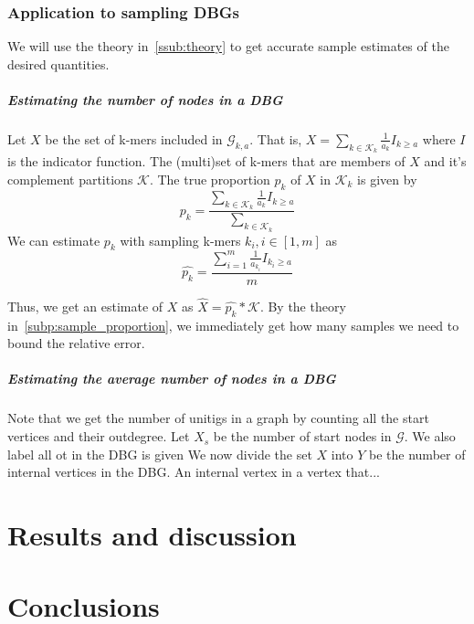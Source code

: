 \documentclass[a4paper,6pt]{article}
\begin{document}
\subsubsection{Application to sampling DBGs} %
\label{sub:application_to_sampling_db_graphs}
We will use the theory in~\ref{ssub:theory} to get accurate sample estimates of the desired quantities. 
\subparagraph{Estimating the number of nodes in a DBG} %
\label{subp:estimating_the_number_of_nodes_in_a_db_graph}
Let $X$ be the set of k-mers included in $\mathcal{G}_{k,a}$. That is, $X = \sum_{k\in \mathcal{K}_k} \frac{1}{a_k}I_{k\geq a}$ where $I$ is the indicator function. The (multi)set of k-mers that are members of $X$ and it's complement partitions $\mathcal{K}$. The true proportion $p_k$ of $X$ in $\mathcal{K}_k$ is given by
\begin{equation}
	p_k = \frac{\sum_{k\in \mathcal{K}_k} \frac{1}{a_k}I_{k\geq a} }{ \sum_{k\in \mathcal{K}_k} }
\end{equation}
 We can estimate $p_k$ with sampling k-mers $k_i, i\in[1,m]$ as
\begin{equation}
	\hat{p_k} = \frac{\sum_{i = 1}^m \frac{1}{a_{k_i}}I_{{k_i}\geq a} } { m}
\end{equation}

 Thus, we get an estimate of $X$ as $\hat{X} = \hat{p_k}*\mathcal{K}$.  By the theory in~\ref{subp:sample_proportion}, we immediately get how many samples we need to bound the relative error. 


\subparagraph{Estimating the average number of nodes in a DBG} %
\label{subp:estimating_the_average_number_of_nodes_in_a_dbg}
 Note that we get the number of unitigs in a graph by counting all the start vertices and their outdegree. Let $X_s$ be the number of start nodes in $\mathcal{G}$. We also label all ot in the DBG is given We now divide the set $X$ into $Y$ be the number of internal vertices in the DBG. An internal vertex in a vertex that... 




\section{Results and discussion} %
\label{sec:results_and_discussion}


\section{Conclusions} %
\label{sec:conclusions}

\end{document}
